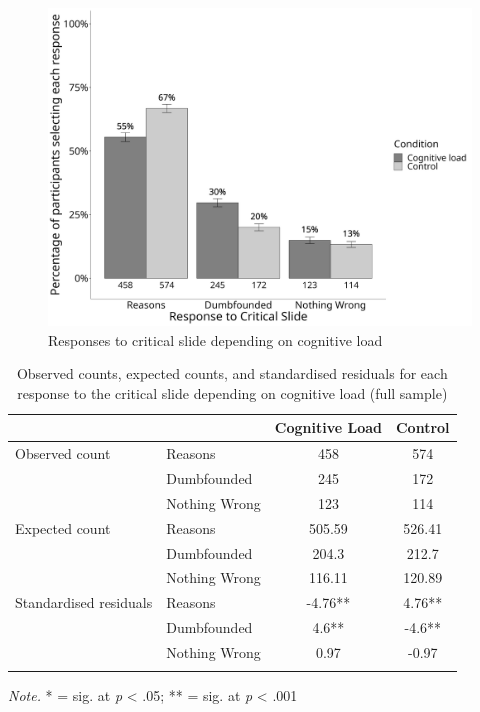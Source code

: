 \documentclass[
  man,floatsintext]{apa6}
\begin{document}
\begin{figure}
\centering
\includegraphics[width=6.25in,height=\textheight]{plots/overall.png}
\caption{Responses to critical slide depending on cognitive load}
\end{figure}

\begin{table}[tbp]

\begin{center}
\begin{threeparttable}

\caption{\label{tab:S6tab1dumb}Observed counts, expected counts, and standardised residuals for each response to the critical slide depending on cognitive load (full sample)}

\begin{tabular}{llcc}
\toprule
 & \multicolumn{1}{c}{} & \multicolumn{1}{c}{Cognitive Load} & \multicolumn{1}{c}{Control}\\
\midrule
Observed count & Reasons & 458 & 574\\
 & Dumbfounded & 245 & 172\\
 & Nothing Wrong & 123 & 114\\
Expected count & Reasons & 505.59 & 526.41\\
 & Dumbfounded & 204.3 & 212.7\\
 & Nothing Wrong & 116.11 & 120.89\\
Standardised residuals & Reasons & -4.76** & 4.76**\\
 & Dumbfounded & 4.6** & -4.6**\\
 & Nothing Wrong & 0.97 & -0.97\\
\bottomrule
\addlinespace
\end{tabular}

\begin{tablenotes}[para]
\normalsize{\textit{Note.} * = sig. at \emph{p} < .05; ** = sig. at \emph{p} < .001}
\end{tablenotes}

\end{threeparttable}
\end{center}

\end{table}
\end{document}
